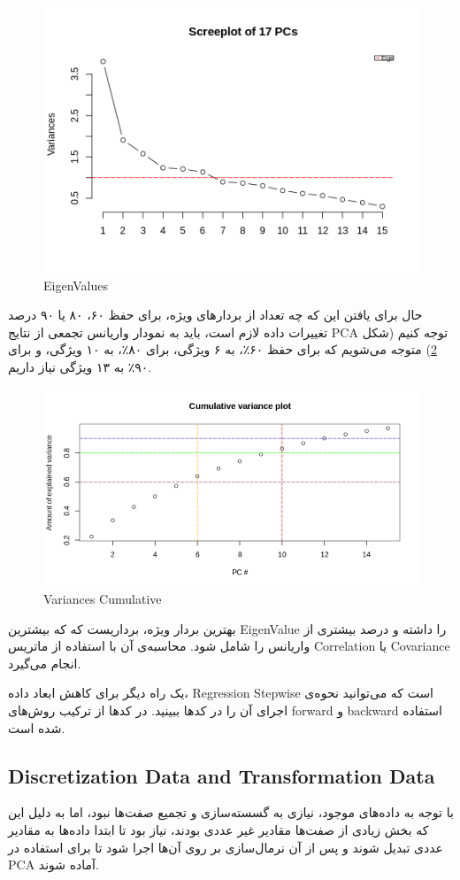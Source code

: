 \documentclass{article}
\begin{document}
\begin{large}
        \begin{figure}[h]
            \centering
            \includegraphics[width=.7\textwidth]{images/pca-ordered-variance.png}
            \caption{EigenValues}
            \label{fig:eigenvalue}
        \end{figure}

        حال برای یافتن این که چه تعداد از بردارهای ویژه، برای حفظ ۶۰، ۸۰ یا ۹۰ درصد تغییرات داده لازم است، باید به نمودار واریانس تجمعی از نتایج PCA توجه کنیم (شکل \ref{fig:var-cum}) متوجه می‌شویم که برای حفظ ۶۰٪، به ۶ ویژگی، برای ۸۰٪، به ۱۰ ویژگی، و برای ۹۰٪ به ۱۳ ویژگی نیاز داریم.
        
        \begin{figure}[h]
            \centering
            \includegraphics[width=.7\textwidth]{images/cumulative-variance.png}
            \caption{Variances Cumulative}
            \label{fig:var-cum}
        \end{figure}

        \newpage
        بهترین بردار ویژه، برداریست که که بیشترین EigenValue را داشته و درصد بیشتری از واریانس را شامل شود. محاسبه‌ی آن با استفاده از ماتریس  Correlation یا Covariance انجام می‌گیرد.

        یک راه دیگر برای کاهش ابعاد داده، Regression Stepwise است که می‌توانید نحوه‌ی اجرای آن را در کدها ببینید. در کدها از ترکیب روش‌های forward و backward استفاده شده است.

        \subsection{Discretization Data and Transformation Data}
        با توجه به داده‌های موجود، نیازی به گسسته‌سازی و تجمیع صفت‌ها نبود، اما به دلیل این که بخش زیادی از صفت‌ها مقادیر غیر عددی بودند، نیاز بود تا ابتدا داده‌ها به مقادیر عددی تبدیل شوند
        و پس از آن نرمال‌سازی بر روی آن‌ها اجرا شود تا برای استفاده در PCA آماده شوند.
        
\end{large}

	 
\end{document}
